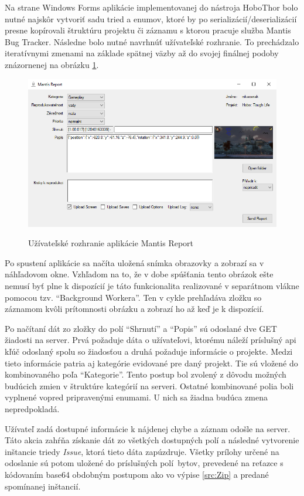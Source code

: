\documentclass[slovak, bachelorpractice]{diploma}
\begin{document}
Na strane Windows Forms aplikácie implementovanej do nástroja HoboThor bolo nutné najskôr vytvoriť sadu tried a enumov, ktoré by po serializácií/deserializácií presne kopírovali štruktúru projektu či záznamu s ktorou pracuje služba Mantis Bug Tracker. Následne bolo nutné navrhnúť užívateľské rozhranie. To prechádzalo iteratívnymi zmenami na základe spätnej väzby až do svojej finálnej podoby znázornenej na obrázku \ref{pic:Report}.

\begin{figure}[!htbp]
	\centering
	\mybox{} {
		\includegraphics[width=.98\textwidth]{Pictures/report.png}
	}
	\caption{Užívateľské rozhranie aplikácie Mantis Report}
	\label{pic:Report}
\end{figure}

Po spustení aplikácie sa načíta uložená snímka obrazovky a zobrazí sa v náhľadovom okne. Vzhľadom na to, že v dobe spúšťania tento obrázok ešte nemusí byť plne k dispozícií je táto funkcionalita realizované v separátnom vlákne pomocou tzv. \enquote{Background Workera}. Ten v cykle prehľadáva zložku so záznamom kvôli prítomnosti obrázku a zobrazí ho až keď je k dispozícií.

Po načítaní dát zo zložky do polí \enquote{Shrnutí} a \enquote{Popis} sú odoslané dve GET žiadosti na server. Prvá požaduje dáta o užívateľovi, ktorému náleží príslušný api kľúč odoslaný spolu so žiadosťou a druhá požaduje informácie o projekte. Medzi tieto informácie patria aj kategórie evidované pre daný projekt. Tie sú vložené do kombinovaného poľa \enquote{Kategorie}. Tento postup bol zvolený z dôvodu možných budúcich zmien v štruktúre kategórií na serveri. Ostatné kombinované polia boli vyplnené vopred pripravenými enumami. U nich sa žiadna budúca zmena nepredpokladá.

Užívateľ zadá dostupné informácie k nájdenej chybe a záznam odošle na server. Táto akcia zahŕňa získanie dát zo všetkých dostupných polí a následné vytvorenie inštancie triedy \textit{Issue}, ktorá tieto dáta zapúzdruje. Všetky prílohy určené na odoslanie sú potom uložené do príslušných \mbox{polí bytov}, prevedené na reťazce s kódovaním base64 obdobným postupom ako vo výpise \ref{src:Zip} a predané spomínanej inštancií.
\end{document}
